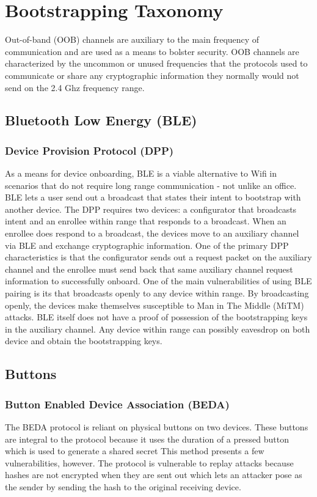 \section{Bootstrapping Taxonomy}

Out-of-band (OOB) channels are auxiliary to the main frequency of communication and are used as a means to bolster security. OOB channels are characterized by the uncommon or unused frequencies that the protocols used to communicate or share any cryptographic information they normally would not send on the 2.4 Ghz frequency range.

\subsection{Bluetooth Low Energy (BLE)}
\subsubsection{Device Provision Protocol (DPP)}
As a means for device onboarding, BLE is a viable alternative to Wifi in scenarios that do not require long range communication - not unlike an office. BLE lets a user send out a broadcast that states their intent to bootstrap with another device. The DPP requires two devices: a configurator that broadcasts intent and an enrollee within range that responds to a broadcast. When an enrollee does respond to a broadcast, the devices move to an auxiliary channel via BLE and exchange cryptographic information. One of the primary DPP characteristics is that the configurator sends out a request packet on the auxiliary channel and the enrollee must send back that same auxiliary channel request information to successfully onboard. One of the main vulnerabilities of using BLE pairing is its that broadcasts openly to any device within range. By broadcasting openly, the devices make themselves susceptible to Man in The Middle (MiTM) attacks. BLE itself does not have a proof of possession of the bootstrapping keys in the auxiliary channel. Any device within range can possibly eavesdrop on both device and obtain the bootstrapping keys.


\subsection{Buttons}
\subsubsection{Button Enabled Device Association (BEDA)}
The BEDA protocol is reliant on physical buttons on two devices. These buttons are integral to the protocol because it uses the duration of a pressed button which is used to generate a shared secret This method presents a few vulnerabilities, however. The protocol is vulnerable to replay attacks because hashes are not encrypted when they are sent out which lets an attacker pose as the sender by sending the hash to the original receiving device.


